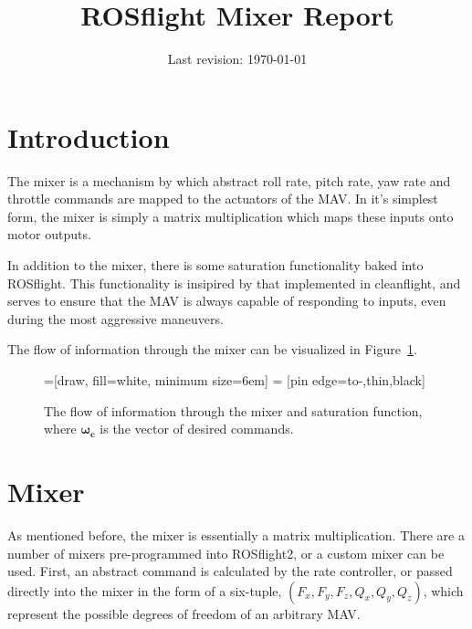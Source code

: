 \documentclass{article}
\title{ROSflight Mixer Report}
\date{Last revision: \today}
\begin{document}
\maketitle
\tableofcontents

\section{Introduction}

The mixer is a mechanism by which abstract roll rate, pitch rate, yaw rate and throttle commands are mapped to the actuators of the MAV.  In it's simplest form, the mixer is simply a matrix multiplication which maps these inputs onto motor outputs.

In addition to the mixer, there is some saturation functionality baked into ROSflight.  This functionality is insipired by that implemented in cleanflight, and serves to ensure that the MAV is always capable of responding to inputs, even during the most aggressive maneuvers.

The flow of information through the mixer can be visualized in Figure~\ref{fig:mixer_flow}.

\begin{figure}[htbp]
	\centering
	=[draw, fill=white, minimum size=6em]
	 = [pin edge={to-,thin,black}]

\label{fig:mixer_flow}
\caption{The flow of information through the mixer and saturation function, where $\bm{\omega_c}$ is the vector of desired commands.}
\end{figure}

\section{Mixer}

As mentioned before, the mixer is essentially a matrix multiplication.
There are a number of mixers pre-programmed into ROSflight2, or a custom mixer can be used. 
First, an abstract command is calculated by the rate controller, or passed directly into the mixer in the form of a six-tuple,  $(F_x, F_y, F_z, Q_x, Q_y, Q_z)$, which represent the possible degrees of freedom of an arbitrary MAV.
\end{document}
